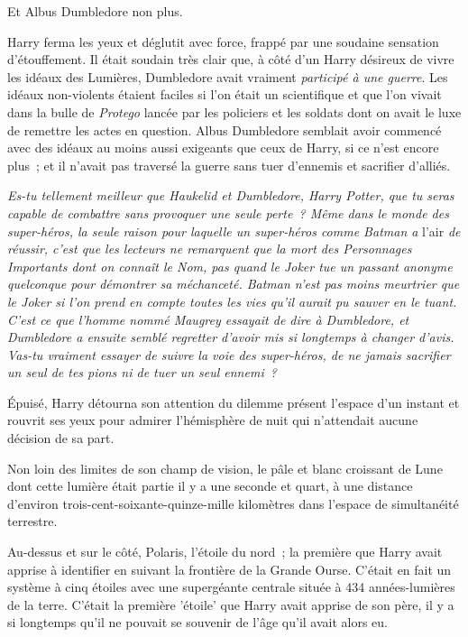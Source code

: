 Et Albus Dumbledore non plus.

Harry ferma les yeux et déglutit avec force, frappé par une soudaine sensation d'étouffement. Il était soudain très clair que, à côté d'un Harry désireux de vivre les idéaux des Lumières, Dumbledore avait vraiment \emph{participé à une guerre}. Les idéaux non-violents étaient faciles si l'on était un scientifique et que l'on vivait dans la bulle de \emph{Protego} lancée par les policiers et les soldats dont on avait le luxe de remettre les actes en question. Albus Dumbledore semblait avoir commencé avec des idéaux au moins aussi exigeants que ceux de Harry, si ce n'est encore plus~; et il n'avait pas traversé la guerre sans tuer d'ennemis et sacrifier d'alliés.

\emph{Es-tu tellement meilleur que Haukelid et Dumbledore, Harry Potter, que tu seras capable de combattre sans provoquer une seule perte~? Même dans le monde des super-héros, la seule raison pour laquelle un super-héros comme Batman a} l'air \emph{de réussir, c'est que les lecteurs ne remarquent que la mort des Personnages Importants dont on connaît le Nom, pas quand le Joker tue un passant anonyme quelconque pour démontrer sa méchanceté. Batman n'est pas moins meurtrier que le Joker si l'on prend en compte toutes les vies qu'il aurait pu sauver en le tuant. C'est ce que l'homme nommé Maugrey essayait de dire à Dumbledore, et Dumbledore a ensuite semblé regretter d'avoir mis si longtemps à changer d'avis. Vas-tu vraiment essayer de suivre la voie des super-héros, de ne jamais sacrifier un seul de tes pions ni de tuer un seul ennemi~?}

Épuisé, Harry détourna son attention du dilemme présent l'espace d'un instant et rouvrit ses yeux pour admirer l'hémisphère de nuit qui n'attendait aucune décision de sa part.

Non loin des limites de son champ de vision, le pâle et blanc croissant de Lune dont cette lumière était partie il y a une seconde et quart, à une distance d'environ trois-cent-soixante-quinze-mille kilomètres dans l'espace de simultanéité terrestre.

Au-dessus et sur le côté, Polaris, l'étoile du nord~; la première que Harry avait apprise à identifier en suivant la frontière de la Grande Ourse. C'était en fait un système à cinq étoiles avec une supergéante centrale située à 434 années-lumières de la terre. C'était la première 'étoile' que Harry avait apprise de son père, il y a si longtemps qu'il ne pouvait se souvenir de l'âge qu'il avait alors eu.

